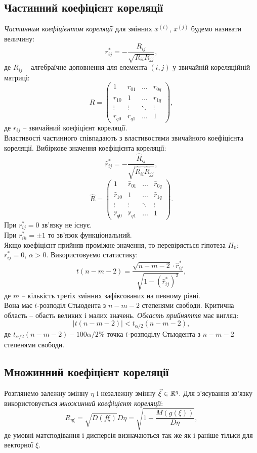 \subsection{Частинний коефіцієнт кореляції}
\textit{Частинним коефіцієнтом кореляції} для змінних $x^{(i)}$, $x^{(j)}$ будемо називати величину: \[r_{ij}^* = - \dfrac{R_{ij}}{\sqrt{R_{ii}R_{jj}}},\] де $R_{ij}$ -- алгебраїчне доповнення для елемента $(i, j)$ у звичайній кореляційній матриці: \[ R = \begin{pmatrix} 1 & r_{01} & \ldots & r_{0q} \\
 r_{10} & 1 & \ldots & r_{1q} \\
 \vdots & \vdots & \ddots & \vdots \\
 r_{q0} & r_{q1} & \ldots & 1 \end{pmatrix}, \] де $r_{ij}$ -- звичайний коефіцієнт кореляції. \\

Властивості частинного співпадають з властивостями звичайного коефіцієнта кореляції. Вибіркове значення коефіцієнта кореляції: \[\widehat{r}_{ij}^* = - \dfrac{\widehat{R}_{ij}}{\sqrt{\widehat{R}_{ii}\widehat{R}_{jj}}},\] \[ \widehat{R} = \begin{pmatrix} 1 & \widehat{r}_{01} & \ldots & \widehat{r}_{0q} \\
 \widehat{r}_{10} & 1 & \ldots & \widehat{r}_{1q} \\
 \vdots & \vdots & \ddots & \vdots \\
 \widehat{r}_{q0} & \widehat{r}_{q1} & \ldots & 1 \end{pmatrix}. \]
При $r_{ij}^* = 0$ зв'язку не існує. \\

При $r_{ih}^* = \pm1$ то зв'язок функціональний. \\

Якщо коефіцієнт прийняв проміжне значення, то перевіряється гіпотеза $H_0$: $r_{ij}^*=0$, $\alpha>0$.  Використовуємо статистику: \[t(n - m - 2) = \dfrac{\sqrt{n - m - 2}\cdot \widehat{r}_{ij}^*}{\sqrt{1 - (\widehat{r}_{ij}^*)^2}},\] де $m$ -- кількість третіх змінних зафіксованих на певному рівні. \\

Вона має $t$-розподіл Стьюдента з $n - m - 2$ степенями свободи. Критична область -- обасть великих і малих значень. \textit{Область прийняття} має вигляд: \[|t(n - m - 2)| < t_{\alpha/2}(n - m - 2),\] де $t_{\alpha/2}(n - m - 2)$ -- $100\alpha/2\%$ точка $t$-розподілу Стьюдента з $n - m - 2$ степенями свободи.
\subsection{Множинний коефіцієнт кореляції}
Розглянемо залежну змінну $\eta$ і незалежну змінну $\vec\xi\in\mathbb{R}^q$. Для з'ясування зв'язку
використовується \textit{множинний коефіцієнт кореляції}: \[R_{\eta\xi} = \sqrt{D(f\xi)}{D\eta}=\sqrt{1-\dfrac{M(g(\xi))}{D\eta}},\] де умовні матсподівання і дисперсія визначаються так же як і раніше тільки для векторної $\xi$. \\

